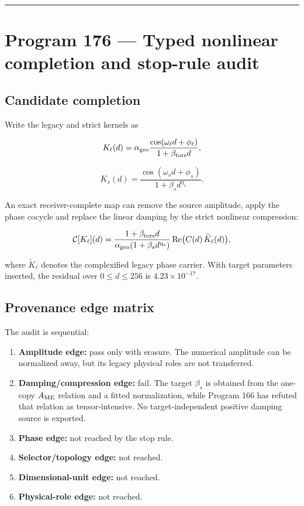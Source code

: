 \documentclass[11pt,a4paper,openany]{report}
\begin{document}
\par\medskip\hrule\medskip

\chapter{Program 176 --- Typed nonlinear completion and stop-rule audit}

\section{Candidate completion}

Write the legacy and strict kernels as

\[
K_\ell(d)
=
\alpha_{\rm geo}
\frac{\cos(\omega_\ell d+\phi_\ell)}
{1+\beta_{\rm tors}d},
\]

\[
K_s(d)
=
\frac{\cos(\omega_s d+\phi_s)}
{1+\beta_s d^{\eta_s}}.
\]

An exact receiver-complete map can remove the source amplitude, apply the phase cocycle and replace the linear damping by the strict nonlinear compression:

\[
\mathcal C[K_\ell](d)
=
\frac{1+\beta_{\rm tors}d}
{\alpha_{\rm geo}(1+\beta_s d^{\eta_s})}
\operatorname{Re}\!\big(C(d)\,\widetilde K_\ell(d)\big),
\]

where \(\widetilde K_\ell\) denotes the complexified legacy phase carrier. With target parameters inserted, the residual over \(0\le d\le256\) is \(4.23\times10^{-17}\).

\section{Provenance edge matrix}

The audit is sequential:

\begin{enumerate}
\item 
\textbf{Amplitude edge:} pass only with erasure. The numerical amplitude can be normalized away, but its legacy physical roles are not transferred.

\item 
\textbf{Damping/\allowbreak{}compression edge:} fail. The target \(\beta_s\) is obtained from the one-copy \(A_{\rm ME}\) relation and a fitted normalization, while Program 166 has refuted that relation as tensor-intensive. No target-independent positive damping source is exported.

\item 
\textbf{Phase edge:} not reached by the stop rule.

\item 
\textbf{Selector/\allowbreak{}topology edge:} not reached.

\item 
\textbf{Dimensional-unit edge:} not reached.

\item 
\textbf{Physical-role edge:} not reached.

\end{enumerate}
\end{document}
